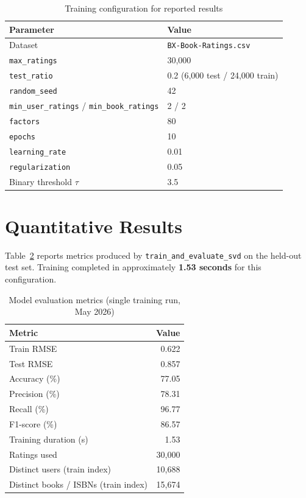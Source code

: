 \documentclass[12pt,a4paper]{report}
\begin{document}
\begin{table}[htbp]
\centering
\caption{Training configuration for reported results}
\label{tab:config}
\begin{tabular}{@{}ll@{}}
\toprule
\textbf{Parameter} & \textbf{Value} \\
\midrule
Dataset & \texttt{BX-Book-Ratings.csv} \\
\texttt{max\_ratings} & 30,000 \\
\texttt{test\_ratio} & 0.2 (6,000 test / 24,000 train) \\
\texttt{random\_seed} & 42 \\
\texttt{min\_user\_ratings} / \texttt{min\_book\_ratings} & 2 / 2 \\
\texttt{factors} & 80 \\
\texttt{epochs} & 10 \\
\texttt{learning\_rate} & 0.01 \\
\texttt{regularization} & 0.05 \\
Binary threshold $\tau$ & 3.5 \\
\bottomrule
\end{tabular}
\end{table}

\section{Quantitative Results}

Table~\ref{tab:metrics} reports metrics produced by \texttt{train\_and\_evaluate\_svd} on the held-out test set. Training completed in approximately \textbf{1.53 seconds} for this configuration.

\begin{table}[htbp]
\centering
\caption{Model evaluation metrics (single training run, May 2026)}
\label{tab:metrics}
\begin{tabular}{@{}lr@{}}
\toprule
\textbf{Metric} & \textbf{Value} \\
\midrule
Train RMSE & 0.622 \\
Test RMSE & 0.857 \\
Accuracy (\%) & 77.05 \\
Precision (\%) & 78.31 \\
Recall (\%) & 96.77 \\
F1-score (\%) & 86.57 \\
Training duration (s) & 1.53 \\
Ratings used & 30,000 \\
Distinct users (train index) & 10,688 \\
Distinct books / ISBNs (train index) & 15,674 \\
\bottomrule
\end{tabular}
\end{table}
\end{document}
